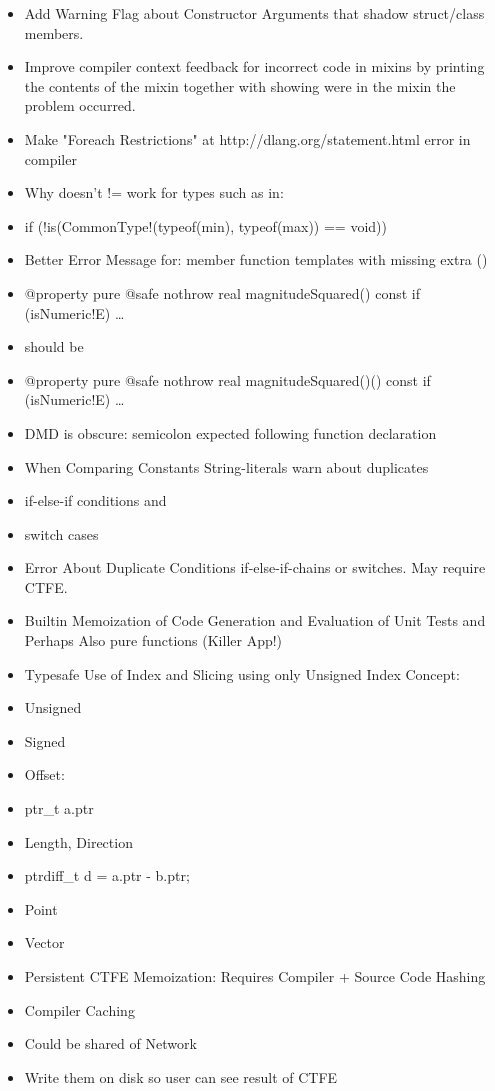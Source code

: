 \documentclass[xcolor=dvipsnames, twocolumn]{article}
\begin{document}
\begin{itemize}
\item Add Warning Flag about Constructor Arguments that shadow struct/class
  members.
\item Improve compiler context feedback for incorrect code in mixins by printing
  the contents of the mixin together with showing were in the mixin the problem
  occurred.
\item Make "Foreach Restrictions" at http://dlang.org/statement.html error in
  compiler
\item Why doesn’t != work for types such as in:
\item if (!is(CommonType!(typeof(min), typeof(max)) == void))
\item Better Error Message for: member function templates with missing extra ()
\item @property pure @safe nothrow real magnitudeSquared() const if
  (isNumeric!E) { … }
\item should be
\item @property pure @safe nothrow real magnitudeSquared()() const if
  (isNumeric!E) { … }
\item DMD is obscure: semicolon expected following function declaration
\item When Comparing Constants String-literals warn about duplicates
\item if-else-if conditions and
\item switch cases
\item Error About Duplicate Conditions if-else-if-chains or switches. May
  require CTFE.
\item Builtin Memoization of Code Generation and Evaluation of Unit Tests and
  Perhaps Also pure functions (Killer App!)
\item Typesafe Use of Index and Slicing using only Unsigned Index Concept:
\item Unsigned
\item Signed
\item Offset:
\item ptr\_t a.ptr
\item Length, Direction
\item ptrdiff\_t d = a.ptr - b.ptr;
\item Point
\item Vector
\item Persistent CTFE Memoization: Requires Compiler + Source Code Hashing
\item Compiler Caching
\item Could be shared of Network
\item Write them on disk so user can see result of CTFE

\end{itemize}
\end{document}
